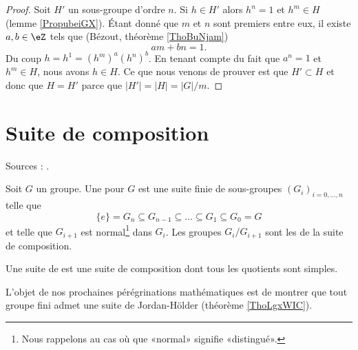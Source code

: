 \begin{proof}
    Soit \( H'\) un sous-groupe d'ordre \( n\). Si \( h\in H'\) alors \( h^n=1\) et \( h^m\in H\) (lemme \ref{PropubeiGX}). Étant donné que \( m\) et \( n\) sont premiers entre eux, il existe \( a,b\in \eZ\) tels que (Bézout, théorème \ref{ThoBuNjam})
    \begin{equation}
        am+bn=1.
    \end{equation}
    Du coup \( h=h^1=(h^m)^a(h^n)^b\). En tenant compte du fait que \( a^n=1\) et \( h^m\in H\), nous avons \( h\in H\). Ce que nous venons de prouver est que \( H'\subset H\) et donc que \( H=H'\) parce que \( | H' |=| H |=| G |/m\).
\end{proof}

\section{Suite de composition}


Sources : \cite{NjCCfW,jxWKGB}.

\begin{definition}  \label{DefJWZSooNcntfK}
Soit \( G\) un groupe. Une  pour \( G\) est une suite finie de sous-groupes \( (G_i)_{i=0,\ldots, n}\) telle que
\begin{equation}
    \{ e \}=G_n\subseteq G_{n-1}\subseteq\ldots\subseteq G_1\subseteq G_0=G
\end{equation}
et telle que \( G_{i+1}\) est normal\footnote{Nous rappelons au cas où que «normal» signifie «distingué».} dans \( G_i\). Les groupes \( G_i/G_{i+1}\) sont les  de la suite de composition.

    Une suite de  est une suite de composition dont tous les quotients sont simples.
\end{definition}
L'objet de nos prochaines pérégrinations mathématiques est de montrer que tout groupe fini admet une suite de Jordan-Hölder (théorème \ref{ThoLgxWIC}).

